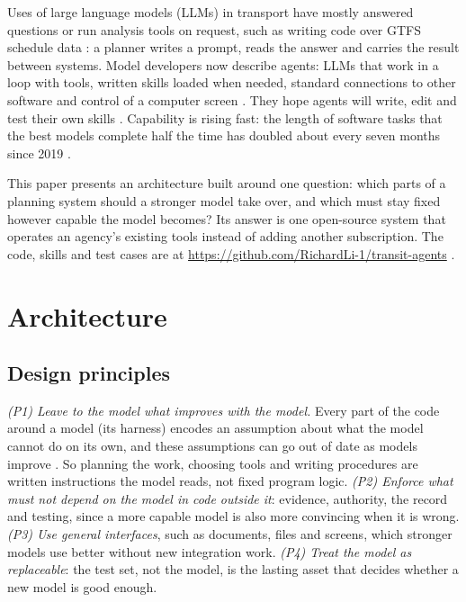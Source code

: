 \documentclass[11pt,a4paper]{article}
\begin{document}
Uses of large language models (LLMs) in transport have mostly answered questions or run analysis tools on request, such as writing code over GTFS schedule data \citep{devunuri2025transitgpt}: a planner writes a prompt, reads the answer and carries the result between systems. Model developers now describe agents: LLMs that work in a loop with tools, written skills loaded when needed, standard connections to other software and control of a computer screen \citep{anthropic2024mcp, schluntz2024effective, zhang2025skills}. They hope agents will write, edit and test their own skills \citep{zhang2025skills}. Capability is rising fast: the length of software tasks that the best models complete half the time has doubled about every seven months since 2019 \citep{kwa2025measuring}.

This paper presents an architecture built around one question: which parts of a planning system should a stronger model take over, and which must stay fixed however capable the model becomes? Its answer is one open-source system that operates an agency's existing tools instead of adding another subscription. The code, skills and test cases are at \mbox{\url{https://github.com/RichardLi-1/transit-agents}} \citep{li2026transitagents}.

\section{Architecture}\label{architecture}

\subsection{Design principles}

\emph{(P1) Leave to the model what improves with the model.} Every part of the code around a model (its harness) encodes an assumption about what the model cannot do on its own, and these assumptions can go out of date as models improve \citep{rajasekaran2026harness}. So planning the work, choosing tools and writing procedures are written instructions the model reads, not fixed program logic. \emph{(P2) Enforce what must not depend on the model in code outside it}: evidence, authority, the record and testing, since a more capable model is also more convincing when it is wrong. \emph{(P3) Use general interfaces}, such as documents, files and screens, which stronger models use better without new integration work. \emph{(P4) Treat the model as replaceable}: the test set, not the model, is the lasting asset that decides whether a new model is good enough.
\end{document}
